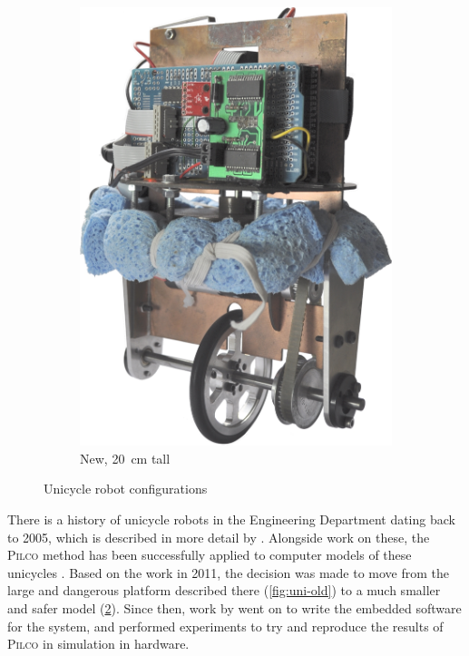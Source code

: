 \documentclass[main.tex]{subfiles}
\begin{document}
\begin{figure}[!hbt]
\begin{subfigure}{0.3\linewidth}
			\includegraphics[width=\linewidth]{figures/front.jpg}
			\caption{New, \SI{20}{\centi\meter} tall}
			\label{fig:uni-new}
		\end{subfigure}
		\hspace*{\fill}
		\caption{Unicycle robot configurations}
	\end{figure}

	There is a history of unicycle robots in the Engineering Department dating back to 2005, which is described in more detail by \citeauthor{queiro} \cite{queiro}.
	Alongside work on these, the \textsc{Pilco} method has been successfully applied to computer models of these unicycles  \cite[section~3.3]{pilco}.
	Based on the work in 2011, the decision was made to move from the large and dangerous platform described there (\cref{fig:uni-old}) to a much smaller and safer model (\cref{fig:uni-new}).
	Since then, work by \citeauthor{aleksi} \cite{aleksi} went on to write the embedded software for the system, and performed experiments to try and reproduce the results of \textsc{Pilco} in simulation in hardware.
\end{document}
